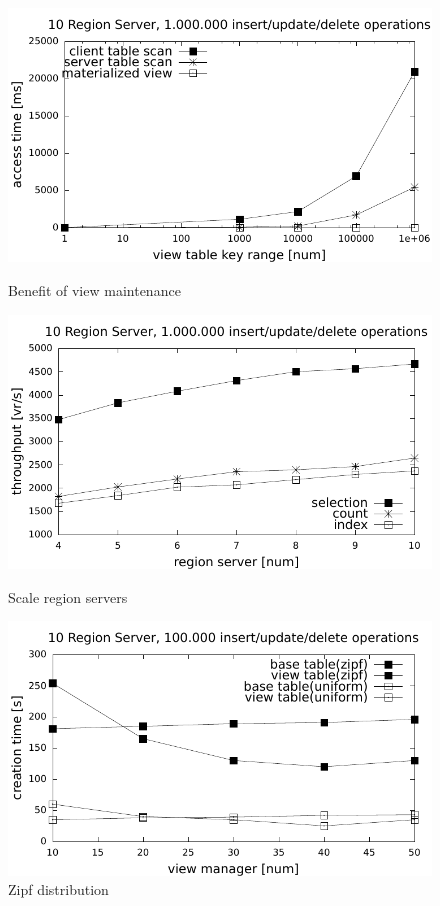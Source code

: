\begin{figure}
  \includegraphics[width=\linewidth]{figures/benefit}
      \vspace{-5mm}
  \caption{Benefit of view maintenance}\label{fig:benefits}
        \vspace{-3mm}
\endminipage\hfill
{}
  \includegraphics[width=\linewidth]{figures/scale_rs}
      \vspace{-5mm}
  \caption{Scale region servers}\label{fig:regionservers}
        \vspace{-3mm}
\endminipage\hfill
{}%
  \includegraphics[width=\linewidth]{figures/zipf}
      \vspace{-5mm}
  \caption{Zipf distribution}\label{fig:zipf}
        \vspace{-3mm}
\endminipage
\end{figure}
